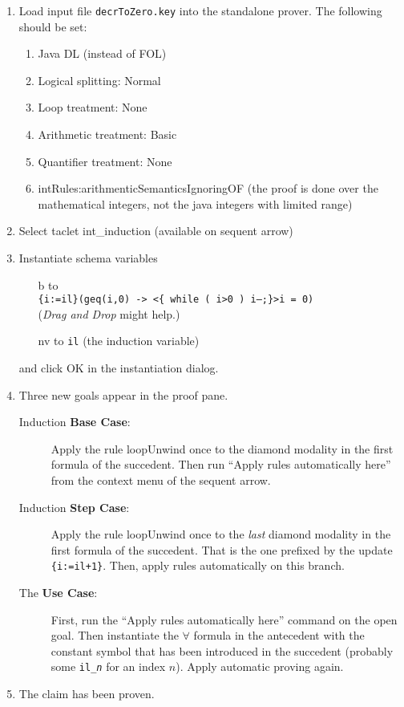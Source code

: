 \documentclass[11pt]{article}
\begin{document}
\begin{enumerate}
\item Load input file \texttt{decrToZero.key} into the standalone
  prover. The following should be set:
  \begin{enumerate}
  \item Java DL (instead of FOL)
  \item Logical splitting: Normal
  \item Loop treatment: None
  \item Arithmetic treatment: Basic
  \item Quantifier treatment: None
  \item intRules:arithmenticSemanticsIgnoringOF (the proof is done
   over the mathematical integers, not the java integers with limited
   range)
  \end{enumerate}

\item Select taclet \textsf{int\_induction} (available on sequent
  arrow)

\item Instantiate schema variables 
  \begin{itemize} 
  \item[\textsf{b}] to \\ \texttt{\{i:=il\}(geq(i,0) -> <\{ while
      ( i>0 )  i--;\}>i = 0)}\\
    (\emph{Drag and Drop} might help.)
  \item[\textsf{nv}] to \texttt{il} (the induction variable) 
  \end{itemize}
  and click \textsf{OK} in the instantiation dialog.


\item Three new goals appear in the proof pane.

  \begin{description}
  \item[Induction \textbf{Base Case}:] Apply the rule
    \textsf{loopUnwind} once to the diamond modality in the first
    formula of the succedent. Then run ``Apply rules automatically
    here'' from the context menu of the sequent arrow.

  \item[Induction \textbf{Step Case}:] Apply the rule
    \textsf{loopUnwind} once to the \emph{last} diamond modality in
    the first formula of the succedent. That is the one prefixed by
    the update \texttt{\{i:=il+1\}}. Then, apply rules automatically on this
    branch.

  \item[The \textbf{Use Case}:] First, run the ``Apply rules
    automatically here'' command on the open goal. Then instantiate
    the $\forall$ formula in the antecedent with the constant symbol
    that has been introduced in the succedent (probably some
    \texttt{il\_{\it n}} for an index $n$). Apply automatic proving
    again.
  \end{description}

\item The claim has been proven.

\end{enumerate}
\end{document}
